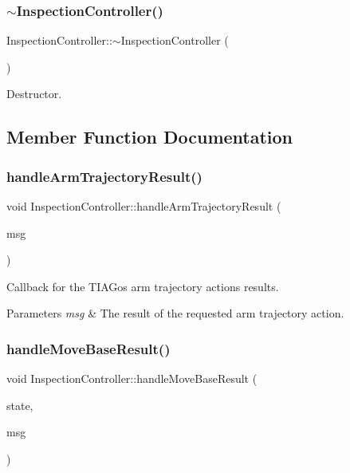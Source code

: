 \subsubsection{\texorpdfstring{$\sim$\+Inspection\+Controller()}{~InspectionController()}}
{\footnotesize\ttfamily Inspection\+Controller\+::$\sim$\+Inspection\+Controller (\begin{DoxyParamCaption}{ }\end{DoxyParamCaption})}

Destructor. 

\subsection{Member Function Documentation}
\mbox{\label{classInspectionController_ac797dd6e2b73f69faeea79c68040ff80}} 
\subsubsection{\texorpdfstring{handle\+Arm\+Trajectory\+Result()}{handleArmTrajectoryResult()}}
{\footnotesize\ttfamily void Inspection\+Controller\+::handle\+Arm\+Trajectory\+Result (\begin{DoxyParamCaption}\item[{const control\+\_\+msgs\+::\+Follow\+Joint\+Trajectory\+Action\+Result\+Const\+Ptr \&}]{msg }\end{DoxyParamCaption})}

Callback for the T\+I\+A\+Go\textquotesingle{}s arm trajectory action\textquotesingle{}s results. 
\begin{DoxyParams}{Parameters}
{\em msg} & The result of the requested arm trajectory action. \\
\hline
\end{DoxyParams}
\mbox{\label{classInspectionController_ae4eedafe47b2ef66b4e2b94030d1a5c7}} 
\subsubsection{\texorpdfstring{handle\+Move\+Base\+Result()}{handleMoveBaseResult()}}
{\footnotesize\ttfamily void Inspection\+Controller\+::handle\+Move\+Base\+Result (\begin{DoxyParamCaption}\item[{const actionlib\+::\+Simple\+Client\+Goal\+State \&}]{state,  }\item[{const move\+\_\+base\+\_\+msgs\+::\+Move\+Base\+Result\+Const\+Ptr \&}]{msg }\end{DoxyParamCaption})}

